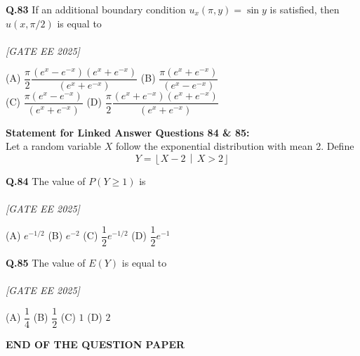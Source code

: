 \documentclass[11pt]{article}
\begin{document}
\begin{flushleft}
\textbf{Q.83} If an additional boundary condition $u_x(\pi, y) = \sin y$ is satisfied, then $u(x, \pi/2)$ is equal to \\
\\[1ex] \textit{[GATE EE 2025]}

(A) $\dfrac{\pi}{2} \dfrac{(e^x - e^{-x})(e^x + e^{-x})}{(e^x + e^{-x})}$ \hspace{2em}
(B) $\dfrac{\pi (e^x + e^{-x})}{(e^x - e^{-x})}$ \\
(C) $\dfrac{\pi (e^x - e^{-x})}{(e^x + e^{-x})}$ \hspace{2em}
(D) $\dfrac{\pi}{2} \dfrac{(e^x + e^{-x})(e^x + e^{-x})}{(e^x + e^{-x})}$
\end{flushleft}

\vspace{1em}
\noindent\textbf{Statement for Linked Answer Questions 84 \& 85:} \\
Let a random variable $X$ follow the exponential distribution with mean 2. Define \\
\[
Y = \left\lfloor X - 2 \,\middle|\, X > 2 \right\rfloor
\]

\begin{flushleft}
\textbf{Q.84} The value of $P(Y \geq 1)$ is \\
\\[1ex] \textit{[GATE EE 2025]}


(A) $e^{-1/2}$ \hspace{2em} (B) $e^{-2}$ \hspace{2em} (C) $\dfrac{1}{2} e^{-1/2}$ \hspace{2em} (D) $\dfrac{1}{2} e^{-1}$
\end{flushleft}

\begin{flushleft}
\textbf{Q.85} The value of $E(Y)$ is equal to \\
\\[1ex] \textit{[GATE EE 2025]}

(A) $\dfrac{1}{4}$ \hspace{2em} (B) $\dfrac{1}{2}$ \hspace{2em} (C) $1$ \hspace{2em} (D) $2$
\end{flushleft}

\vspace{2em}
\begin{center}
\textbf{END OF THE QUESTION PAPER}
\end{center}
\end{document}
